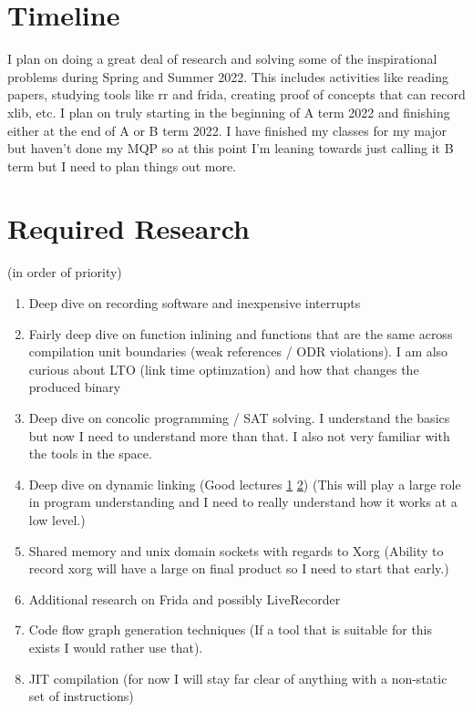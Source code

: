 \section{Timeline}
I plan on doing a great deal of research and solving some of the inspirational problems during Spring and Summer 2022. This includes activities like reading papers, studying tools like rr and frida, creating proof of concepts that can record xlib, etc. 
I plan on truly starting in the beginning of A term 2022 and finishing either at the end of A or B term 2022. I have finished my classes for my major but haven't done my MQP so at this point I'm leaning towards just calling it B term but I need to plan things out more. 

\section{Required Research}
(in order of priority)
\begin{enumerate}
    \item Deep dive on recording software and inexpensive interrupts
    \item Fairly deep dive on function inlining and functions that are the same across compilation unit boundaries (weak references / ODR violations). I am also curious about LTO (link time optimzation) and how that changes the produced binary
    \item Deep dive on concolic programming / SAT solving. I understand the basics but now I need to understand more than that. I also not very familiar with the tools in the space. 
    \item Deep dive on dynamic linking (Good lectures \href{https://www.youtube.com/watch?v=dOfucXtyEsU}{1}  \href{https://www.youtube.com/watch?v=8nyq8SNUTSc}{2}) (This will play a large role in program understanding and I need to really understand how it works at a low level.)
    \item Shared memory and unix domain sockets with regards to Xorg (Ability to record xorg will have a large on final product so I need to start that early.)
    \item Additional research on Frida and possibly LiveRecorder
    \item Code flow graph generation techniques (If a tool that is suitable for this exists I would rather use that).
    \item JIT compilation (for now I will stay far clear of anything with a non-static set of instructions)

\end{enumerate}


